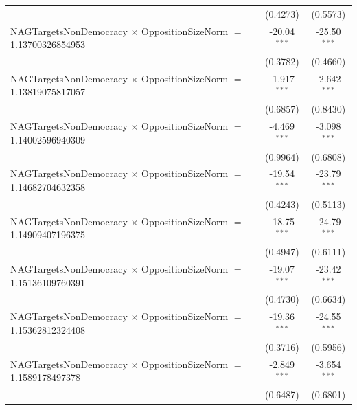 \begin{tabular}{lcc}
                                                                                & (0.4273)             & (0.5573)\\   
   NAGTargetsNonDemocracy $\times$ OppositionSizeNorm $=$ 1.13700326854953      & -20.04$^{***}$       & -25.50$^{***}$\\   
                                                                                & (0.3782)             & (0.4660)\\   
   NAGTargetsNonDemocracy $\times$ OppositionSizeNorm $=$ 1.13819075817057      & -1.917$^{***}$       & -2.642$^{***}$\\   
                                                                                & (0.6857)             & (0.8430)\\   
   NAGTargetsNonDemocracy $\times$ OppositionSizeNorm $=$ 1.14002596940309      & -4.469$^{***}$       & -3.098$^{***}$\\   
                                                                                & (0.9964)             & (0.6808)\\   
   NAGTargetsNonDemocracy $\times$ OppositionSizeNorm $=$ 1.14682704632358      & -19.54$^{***}$       & -23.79$^{***}$\\   
                                                                                & (0.4243)             & (0.5113)\\   
   NAGTargetsNonDemocracy $\times$ OppositionSizeNorm $=$ 1.14909407196375      & -18.75$^{***}$       & -24.79$^{***}$\\   
                                                                                & (0.4947)             & (0.6111)\\   
   NAGTargetsNonDemocracy $\times$ OppositionSizeNorm $=$ 1.15136109760391      & -19.07$^{***}$       & -23.42$^{***}$\\   
                                                                                & (0.4730)             & (0.6634)\\   
   NAGTargetsNonDemocracy $\times$ OppositionSizeNorm $=$ 1.15362812324408      & -19.36$^{***}$       & -24.55$^{***}$\\   
                                                                                & (0.3716)             & (0.5956)\\   
   NAGTargetsNonDemocracy $\times$ OppositionSizeNorm $=$ 1.1589178497378       & -2.849$^{***}$       & -3.654$^{***}$\\   
                                                                                & (0.6487)             & (0.6801)\\   

\end{tabular}
